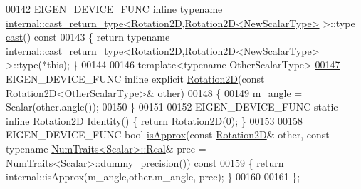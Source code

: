 \begin{DoxyCode}
\hyperlink{group___geometry___module_a7a2057f37733b0d153f542fffe8207cf}{00142}   EIGEN\_DEVICE\_FUNC \textcolor{keyword}{inline} \textcolor{keyword}{typename} 
      \hyperlink{struct_eigen_1_1internal_1_1cast__return__type}{internal::cast\_return\_type<Rotation2D,Rotation2D<NewScalarType>}
       >::type \hyperlink{group___geometry___module_a7a2057f37733b0d153f542fffe8207cf}{cast}()\textcolor{keyword}{ const}
00143 \textcolor{keyword}{  }\{ \textcolor{keywordflow}{return} \textcolor{keyword}{typename} 
      \hyperlink{struct_eigen_1_1internal_1_1cast__return__type}{internal::cast\_return\_type<Rotation2D,Rotation2D<NewScalarType>}
       >::type(*\textcolor{keyword}{this}); \}
00144 
00146   \textcolor{keyword}{template}<\textcolor{keyword}{typename} OtherScalarType>
\hyperlink{group___geometry___module_a28141c131bb66516477e07752278c139}{00147}   EIGEN\_DEVICE\_FUNC \textcolor{keyword}{inline} \textcolor{keyword}{explicit} \hyperlink{group___geometry___module_a28141c131bb66516477e07752278c139}{Rotation2D}(\textcolor{keyword}{const} 
      \hyperlink{group___geometry___module_class_eigen_1_1_rotation2_d}{Rotation2D<OtherScalarType>}& other)
00148   \{
00149     m\_angle = Scalar(other.angle());
00150   \}
00151 
00152   EIGEN\_DEVICE\_FUNC \textcolor{keyword}{static} \textcolor{keyword}{inline} \hyperlink{group___geometry___module_class_eigen_1_1_rotation2_d}{Rotation2D} Identity() \{ \textcolor{keywordflow}{return} 
      \hyperlink{group___geometry___module_class_eigen_1_1_rotation2_d}{Rotation2D}(0); \}
00153 
\hyperlink{group___geometry___module_ac70ab985fd67d3cc43ea75c33c01ae3a}{00158}   EIGEN\_DEVICE\_FUNC \textcolor{keywordtype}{bool} \hyperlink{group___geometry___module_ac70ab985fd67d3cc43ea75c33c01ae3a}{isApprox}(\textcolor{keyword}{const} \hyperlink{group___geometry___module_class_eigen_1_1_rotation2_d}{Rotation2D}& other, \textcolor{keyword}{const} \textcolor{keyword}{typename} 
      \hyperlink{group___core___module_struct_eigen_1_1_num_traits}{NumTraits<Scalar>::Real}& prec = 
      \hyperlink{group___core___module_struct_eigen_1_1_num_traits}{NumTraits<Scalar>::dummy\_precision}())\textcolor{keyword}{ const}
00159 \textcolor{keyword}{  }\{ \textcolor{keywordflow}{return} internal::isApprox(m\_angle,other.m\_angle, prec); \}
00160   
00161 \};

\end{DoxyCode}
